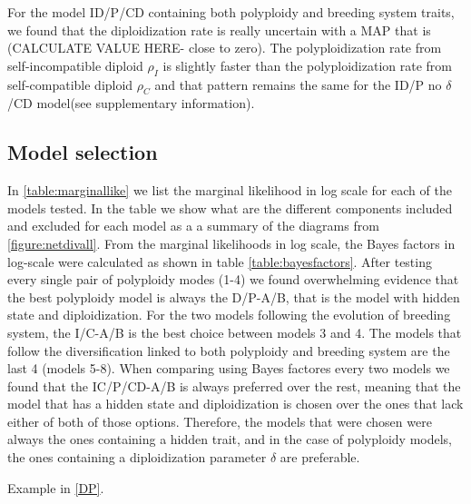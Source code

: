 For the model ID/P/CD containing both polyploidy and breeding system traits, we found that the diploidization rate is really uncertain with a MAP that is (CALCULATE VALUE HERE- close to zero). The polyploidization rate from self-incompatible diploid $\rho_I$ is slightly faster than the polyploidization rate from self-compatible diploid $\rho_C$  and that pattern remains the same for the ID/P no $\delta$/CD model(see supplementary information).

\subsection{Model selection}

In \cref{table:marginallike} we list the marginal likelihood in log scale for each of the models tested. In the table we show what are the different components included and excluded for each model as a a summary of the diagrams from \cref{figure:netdivall}. From the marginal likelihoods in log scale, the Bayes factors in log-scale were calculated as shown in table \cref{table:bayesfactors}. After testing every single pair of polyploidy modes (1-4) we found overwhelming evidence that the best polyploidy model is always  the D/P-A/B, that is the model with hidden state and diploidization. \newline
For the two models following the evolution of breeding system, the I/C-A/B is the best choice between models 3 and 4.\newline
The models that follow the diversification linked to both polyploidy and breeding system are the last 4 (models 5-8). When comparing using Bayes factores every two models we found that the IC/P/CD-A/B is always preferred over the rest, meaning that the model that has a hidden state and diploidization is chosen over the ones that lack either of both of those options.\newline
Therefore, the models that were chosen were always the ones containing a hidden trait, and in the case of polyploidy models, the ones containing a diploidization parameter $\delta$ are preferable.



Example in \cref{DP}. %

